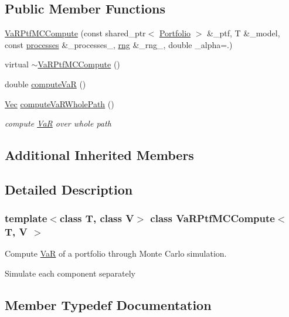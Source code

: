 \subsection*{Public Member Functions}
\begin{DoxyCompactItemize}
\item 
\hyperlink{classVaRPtfMCCompute_aa3549f10b2f7e51c4fc213cf1c58268c}{Va\+R\+Ptf\+M\+C\+Compute} (const shared\+\_\+ptr$<$ \hyperlink{classPortfolio}{Portfolio} $>$ \&\+\_\+ptf, T \&\+\_\+model, const \hyperlink{classVaRPtfMCCompute_a019d051e785efc490f2428be67bfb752}{processes} \&\+\_\+processes\+\_\+, \hyperlink{classrng}{rng} \&\+\_\+rng\+\_\+, double \+\_\+alpha=.)
\item 
virtual \hyperlink{classVaRPtfMCCompute_a2172aaa668de0fff6c40b2a60ddd51d9}{$\sim$\+Va\+R\+Ptf\+M\+C\+Compute} ()
\item 
double \hyperlink{classVaRPtfMCCompute_acd3f40602de413a00691acfb3b315982}{compute\+VaR} ()
\item 
\hyperlink{compute__returns__eigen_8h_a1eb6a9306ef406d7975f3cbf2e247777}{Vec} \hyperlink{classVaRPtfMCCompute_a0ad1f3807e5d4df9a6f1212f754fa2cc}{compute\+Va\+R\+Whole\+Path} ()
\begin{DoxyCompactList}\small\item\em compute \hyperlink{classVaR}{VaR} over whole path \end{DoxyCompactList}\end{DoxyCompactItemize}
\subsection*{Additional Inherited Members}


\subsection{Detailed Description}
\subsubsection*{template$<$class T, class V$>$\newline
class Va\+R\+Ptf\+M\+C\+Compute$<$ T, V $>$}

Compute \hyperlink{classVaR}{VaR} of a portfolio through Monte Carlo simulation. 

Simulate each component separately 

\subsection{Member Typedef Documentation}
\hypertarget{classVaRPtfMCCompute_a77b17bb3264e1b7e90485290d84f9ed0}{}\label{classVaRPtfMCCompute_a77b17bb3264e1b7e90485290d84f9ed0} 
